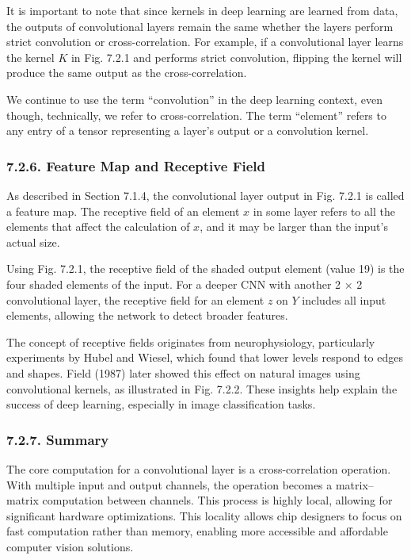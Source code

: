 \documentclass[11pt]{article}
\begin{document}
It is important to note that since kernels in deep learning are learned
from data, the outputs of convolutional layers remain the same whether
the layers perform strict convolution or cross-correlation. For example,
if a convolutional layer learns the kernel \(K\) in Fig. 7.2.1 and
performs strict convolution, flipping the kernel will produce the same
output as the cross-correlation.

We continue to use the term ``convolution'' in the deep learning
context, even though, technically, we refer to cross-correlation. The
term ``element'' refers to any entry of a tensor representing a layer's
output or a convolution kernel.

    \subsubsection*{7.2.6. Feature Map and Receptive
Field}\label{feature-map-and-receptive-field}

    As described in Section 7.1.4, the convolutional layer output in Fig.
7.2.1 is called a feature map. The receptive field of an element \(x\)
in some layer refers to all the elements that affect the calculation of
\(x\), and it may be larger than the input's actual size.

Using Fig. 7.2.1, the receptive field of the shaded output element
(value 19) is the four shaded elements of the input. For a deeper CNN
with another 2 × 2 convolutional layer, the receptive field for an
element \(z\) on \(Y\) includes all input elements, allowing the network
to detect broader features.

The concept of receptive fields originates from neurophysiology,
particularly experiments by Hubel and Wiesel, which found that lower
levels respond to edges and shapes. Field (1987) later showed this
effect on natural images using convolutional kernels, as illustrated in
Fig. 7.2.2. These insights help explain the success of deep learning,
especially in image classification tasks.

    \subsubsection*{7.2.7. Summary}\label{summary}

    The core computation for a convolutional layer is a cross-correlation
operation. With multiple input and output channels, the operation
becomes a matrix--matrix computation between channels. This process is
highly local, allowing for significant hardware optimizations. This
locality allows chip designers to focus on fast computation rather than
memory, enabling more accessible and affordable computer vision
solutions.
\end{document}
